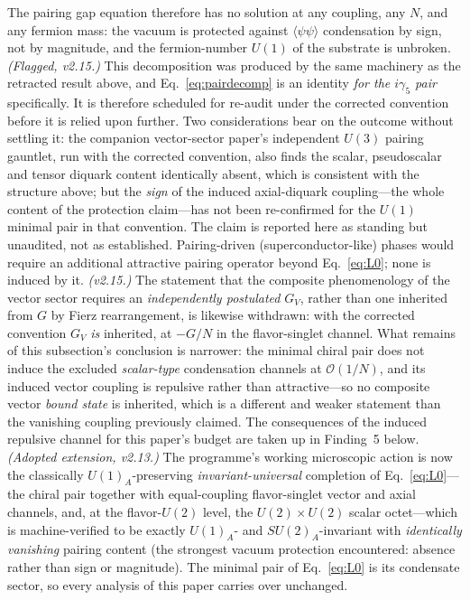 \documentclass[11pt,a4paper]{article}
\begin{document}
The pairing gap equation therefore has no solution at any
coupling, any $N$, and any fermion mass: the vacuum is protected
against $\langle\psi\psi\rangle$ condensation by sign, not by
magnitude, and the fermion-number $U(1)$ of the substrate is
unbroken.
\emph{(Flagged, v2.15.)}  This decomposition was produced by the
same machinery as the retracted result above, and
Eq.~\eqref{eq:pairdecomp} is an identity \emph{for the
$i\gamma_5$ pair} specifically.  It is therefore scheduled for
re-audit under the corrected convention before it is relied upon
further.  Two considerations bear on the outcome without settling
it: the companion vector-sector paper's independent
$U(3)$ pairing gauntlet, run with the corrected convention, also
finds the scalar, pseudoscalar and tensor diquark content
identically absent, which is consistent with the structure above;
but the \emph{sign} of the induced axial-diquark coupling---the
whole content of the protection claim---has not been
re-confirmed for the $U(1)$ minimal pair in that convention.  The
claim is reported here as standing but unaudited, not as
established.  Pairing-driven (superconductor-like) phases would
require an additional attractive pairing operator beyond
Eq.~\eqref{eq:L0}; none is induced by it.
\emph{(v2.15.)}  The statement that the composite phenomenology of
the vector sector requires an \emph{independently postulated}
$G_V$, rather than one inherited from $G$ by Fierz rearrangement,
is likewise withdrawn: with the corrected convention $G_V$
\emph{is} inherited, at $-G/N$ in the flavor-singlet channel.
What remains of this subsection's conclusion is narrower: the
minimal chiral pair does not induce the excluded \emph{scalar-type}
condensation channels at $\mathcal{O}(1/N)$, and its induced
vector coupling is repulsive rather than attractive---so no
composite vector \emph{bound state} is inherited, which is a
different and weaker statement than the vanishing coupling
previously claimed.  The consequences of the induced repulsive
channel for this paper's budget are taken up in Finding~5 below.
\emph{(Adopted extension, v2.13.)}  The programme's working
microscopic action is now the classically
$U(1)_A$-preserving \emph{invariant-universal} completion of
Eq.~\eqref{eq:L0}---the chiral pair together with equal-coupling
flavor-singlet vector and axial channels, and, at the
flavor-$U(2)$ level, the $U(2)\times U(2)$ scalar octet---which
is machine-verified to be exactly $U(1)_A$- and
$SU(2)_A$-invariant with \emph{identically vanishing} pairing
content (the strongest vacuum protection encountered: absence
rather than sign or magnitude).  The minimal pair of
Eq.~\eqref{eq:L0} is its condensate sector, so every analysis of
this paper carries over unchanged.
\end{document}
